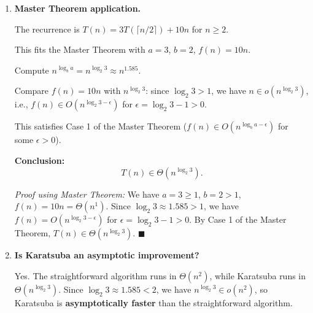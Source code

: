 \documentclass[11pt]{article}
\begin{document}
\begin{enumerate}[label=\textbf{(\alph*)}]
\item \textbf{Master Theorem application.}

The recurrence is $T(n) = 3T(\lceil n/2\rceil) + 10n$ for $n \ge 2$.

This fits the Master Theorem with $a = 3$, $b = 2$, $f(n) = 10n$.

Compute $n^{\log_b a} = n^{\log_2 3} \approx n^{1.585}$.

Compare $f(n) = 10n$ with $n^{\log_2 3}$: since $\log_2 3 > 1$, we have $n \in o(n^{\log_2 3})$, i.e., $f(n) \in O(n^{\log_2 3 - \epsilon})$ for $\epsilon = \log_2 3 - 1 > 0$.

This satisfies Case 1 of the Master Theorem ($f(n) \in O(n^{\log_b a - \epsilon})$ for some $\epsilon > 0$).

\textbf{Conclusion:}
\[
  T(n) \in \Theta(n^{\log_2 3}).
\]

\textit{Proof using Master Theorem:} We have $a=3 \ge 1$, $b=2 > 1$, $f(n) = 10n = \Theta(n^1)$. Since $\log_2 3 \approx 1.585 > 1$, we have $f(n) = O(n^{\log_2 3 - \epsilon})$ for $\epsilon = \log_2 3 - 1 > 0$. By Case 1 of the Master Theorem, $T(n) \in \Theta(n^{\log_2 3})$. $\blacksquare$

\item \textbf{Is Karatsuba an asymptotic improvement?}

Yes. The straightforward algorithm runs in $\Theta(n^2)$, while Karatsuba runs in $\Theta(n^{\log_2 3})$. Since $\log_2 3 \approx 1.585 < 2$, we have $n^{\log_2 3} \in o(n^2)$, so Karatsuba is \textbf{asymptotically faster} than the straightforward algorithm.

\end{enumerate}
\end{document}
